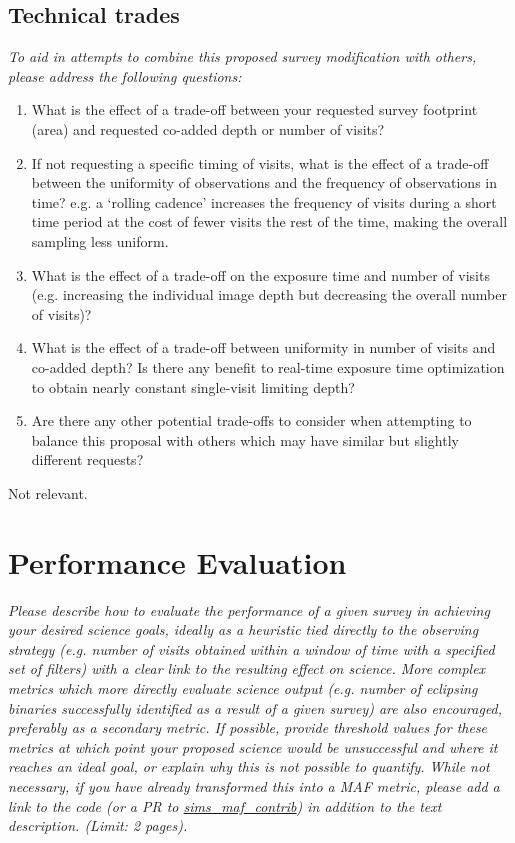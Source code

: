 \documentclass[11pt]{article}
\begin{document}
\subsection{Technical trades}
\begin{footnotesize}
{\it To aid in attempts to combine this proposed survey modification with others, please address the following questions:
\begin{enumerate}
    \item What is the effect of a trade-off between your requested survey footprint (area) and requested co-added depth or number of visits?
    \item If not requesting a specific timing of visits, what is the effect of a trade-off between the uniformity of observations and the frequency of observations in time? e.g. a `rolling cadence' increases the frequency of visits during a short time period at the cost of fewer visits the rest of the time, making the overall sampling less uniform.
    \item What is the effect of a trade-off on the exposure time and number of visits (e.g. increasing the individual image depth but decreasing the overall number of visits)?
    \item What is the effect of a trade-off between uniformity in number of visits and co-added depth? Is there any benefit to real-time exposure time optimization to obtain nearly constant single-visit limiting depth?
    \item Are there any other potential trade-offs to consider when attempting to balance this proposal with others which may have similar but slightly different requests?
\end{enumerate}}
\end{footnotesize}

Not relevant.

\section{Performance Evaluation}
\begin{footnotesize}
{\it Please describe how to evaluate the performance of a given survey in achieving your desired
science goals, ideally as a heuristic tied directly to the observing strategy (e.g. number of visits obtained
within a window of time with a specified set of filters) with a clear link to the resulting effect on science.
More complex metrics which more directly evaluate science output (e.g. number of eclipsing binaries successfully
identified as a result of a given survey) are also encouraged, preferably as a secondary metric.
If possible, provide threshold values for these metrics at which point your proposed science would be unsuccessful 
and where it reaches an ideal goal, or explain why this is not possible to quantify. While not necessary, 
if you have already transformed this into a MAF metric, please add a link to the code (or a PR to 
\href{https://github.com/lsst-nonproject/sims_maf_contrib}{sims\_maf\_contrib}) in addition to the text description. (Limit: 2 pages).}
\end{footnotesize}
\end{document}
